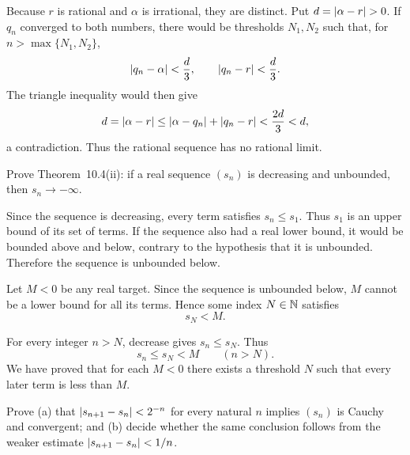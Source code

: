Because $r$ is rational and $\alpha$ is irrational, they are distinct.
Put $d=\abs{\alpha-r}>0$. If $q_n$ converged to both numbers, there
would be thresholds $N_1,N_2$ such that, for
$n>\max\{N_1,N_2\}$,
\[
 \left|q_n-\alpha\right|<\frac d3,
 \qquad
 \left|q_n-r\right|<\frac d3.
\]
The triangle inequality would then give
\[
 d=\left|\alpha-r\right|
   \le\left|\alpha-q_n\right|+\left|q_n-r\right|
   <\frac{2d}{3}<d,
\]
a contradiction. Thus the rational sequence has no rational limit.



\goal Prove Theorem~10.4(ii): if a real sequence $(s_n)$ is decreasing
and unbounded, then $s_n\to-\infty$.

Since the sequence is decreasing, every term satisfies $s_n\le s_1$.
Thus $s_1$ is an upper bound of its set of terms. If the sequence also
had a real lower bound, it would be bounded above and below, contrary
to the hypothesis that it is unbounded. Therefore the sequence is
unbounded below.

Let $M<0$ be any real target. Since the sequence is unbounded below,
$M$ cannot be a lower bound for all its terms. Hence some index
$N\in\mathbb{N}$ satisfies
\[
 s_N<M.
\]

For every integer $n>N$, decrease gives $s_n\le s_N$. Thus
\[
 s_n\le s_N<M\qquad(n>N).
\]
We have proved that for each $M<0$ there exists a threshold $N$ such
that every later term is less than $M$.



\goal Prove (a) that $\left|s_{n+1}-s_n\right|<2^{-n}$ for every natural
$n$ implies $(s_n)$ is Cauchy and convergent; and (b) decide whether
the same conclusion follows from the weaker estimate
$\left|s_{n+1}-s_n\right|<1/n$.

